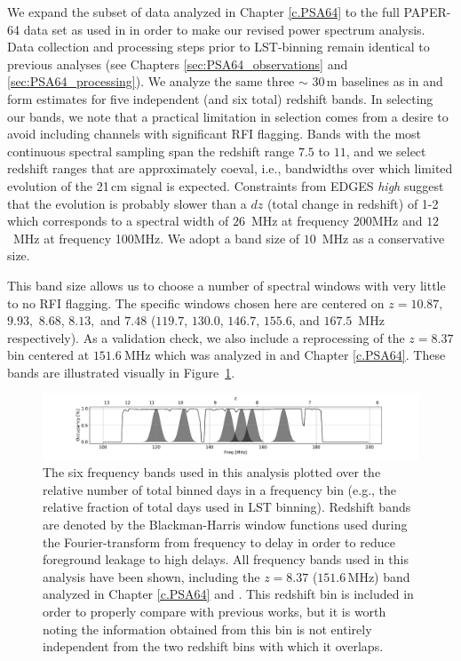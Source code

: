 We expand the subset of data analyzed in Chapter \ref{c.PSA64} to the full PAPER-64 data set as used in  in order to make our revised power spectrum analysis. Data collection and processing steps prior to LST-binning remain identical to previous analyses (see Chapters \ref{sec:PSA64_observations} and \ref{sec:PSA64_processing}). We analyze the same three $\sim$ 30\,m baselines as in  and form estimates for five independent (and six total) redshift bands. In selecting our bands, we note that a practical limitation in selection
comes from a desire to avoid including channels with significant RFI flagging.
Bands with the most continuous spectral sampling span the redshift range $7.5$ to $11$, and we select redshift ranges that are approximately coeval, i.e., bandwidths over which limited evolution of the 21\,cm signal is expected.
Constraints from EDGES \emph{high} suggest that the evolution is probably slower than a $dz$ (total change in
redshift) of 1-2 \citep{monsalve_et_al2017} 
which corresponds to a spectral width of $ 26 $~MHz at frequency 200MHz and 
$12$~MHz at frequency 100MHz.  We adopt a band size of $10$~MHz as a conservative size.

This band size allows us to choose a number of spectral windows with very little to no RFI flagging.  The specific windows chosen here are centered on
$z=10.87,$ $9.93,$ $8.68$, $8.13,$ and $7.48$ ($119.7$, $130.0$, $146.7$, $155.6$, and $167.5$~MHz respectively).
As a validation check, we also include
a reprocessing of the $z=8.37$ bin centered at $151.6~$MHz
which was analyzed in  and Chapter \ref{c.PSA64}.
These bands are illustrated visually in Figure~\ref{fig:freq_select}.

\begin{figure}[t]
\centering
\includegraphics[trim={4cm 0  5cm 0},width=\textwidth]{plots/freq_select_BH.pdf}
\caption{The six frequency bands used in this analysis plotted over the relative number of total binned days in a frequency bin (e.g., the relative fraction of total days used in LST binning).
Redshift bands are denoted by the
Blackman-Harris window functions used during
the Fourier-transform from frequency to delay in order
to reduce foreground leakage to high delays.
All frequency bands used in this analysis have been shown, including the $z=8.37$ ($151.6$\,MHz) band analyzed in Chapter \ref{c.PSA64} and \citet{ali_et_al2015}.
This redshift bin is included in order
to properly compare with previous works,
but it is worth noting the information
obtained from this bin is not entirely independent from the two
redshift bins with which it overlaps.
\label{fig:freq_select}}
\end{figure}

